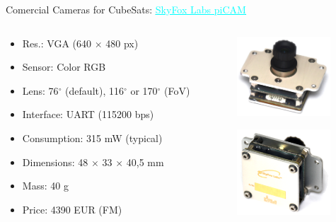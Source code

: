 
\begin{frame}{Comercial Cameras for CubeSats: \href{https://www.skyfoxlabs.com/product/27-digital-cubesat-camera}{\textcolor{cyan}{\underline{SkyFox Labs piCAM}}}}

    \begin{columns}[t]
        \begin{column}[t]{0.65\textwidth}
            \begin{itemize}
                \item Res.: VGA (640 $\times$ 480 px)
                \item Sensor: Color RGB
                \item Lens: 76$^{\circ}$ (default), 116$^{\circ}$ or 170$^{\circ}$ (FoV)
                \item Interface: UART (115200 bps) 
                \item Consumption: 315 mW (typical)
                \item Dimensions: 48 $\times$ 33 $\times$ 40,5 mm
                \item Mass: 40 g
                \item Price: 4390 EUR (FM)
            \end{itemize}
        \end{column}
        \begin{column}[t]{0.35\textwidth}
            \begin{figure}[!ht]
                \begin{center}
                    \includegraphics[width=3.5cm]{figures/picam-front}
                \end{center}
            \end{figure}
            \begin{figure}[!ht]
                \begin{center}
                    \includegraphics[width=3.5cm]{figures/picam-back}
                \end{center}
            \end{figure}
        \end{column}
    \end{columns}
    
\end{frame}

